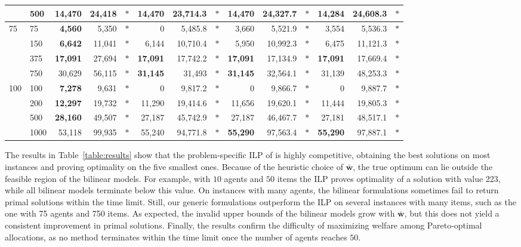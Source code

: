 \documentclass[a4paper, 11pt]{article}
\begin{document}
\begin{table}[htbp!]
\begin{adjustbox}{max width= \textwidth}
\begin{tabular}{@{\extracolsep{0pt}}llrrrrrrrrrrrr}
        & 500 & \textbf{14,470} & 24,418 & $*$ & \textbf{14,470} & 23,714.3 & $*$ & \textbf{14,470} & 24,327.7 & $*$ & 14,284 & 24,608.3 & $*$ \\ 
        \midrule
		\multirow{4}{*}{75} & 75 & \textbf{4,560} & 5,350 & $*$ & 0 & 5,485.8 & $*$ & 3,660 & 5,521.9 & $*$ & 3,554 & 5,536.3 & $*$ \\ 
		& 150 & \textbf{6,642} & 11,041 & $*$ & 6,144 & 10,710.4 & $*$ & 5,950 & 10,992.3 & $*$ & 6,475 & 11,121.3 & $*$ \\
        & 375 & \textbf{17,091} & 27,694 & $*$ & \textbf{17,091} & 17,742.2 & $*$ & \textbf{17,091} & 17,134.9 & $*$ & \textbf{17,091} & 17,669.4 & $*$ \\
        & 750 & 30,629 & 56,115 & $*$ & \textbf{31,145} & 31,493 & $*$ & \textbf{31,145} & 32,564.1 & $*$ & 31,139 & 48,253.3 & $*$ \\ 
        \midrule
		\multirow{4}{*}{100} & 100 & \textbf{7,278} & 9,631 & $*$ & 0 & 9,817.2 & $*$ & 0 & 9,866.7 & $*$ & 0 & 9,887.7 & $*$ \\ 
		& 200 & \textbf{12,297} & 19,732 & $*$ & 11,290 & 19,414.6 & $*$ & 11,656 & 19,620.1 & $*$ & 11,444 & 19,805.3 & $*$ \\
        & 500 & \textbf{28,160} & 49,507 & $*$ & 27,187 & 45,742.9 & $*$ & 27,187 & 46,467.7 & $*$ & 27,181 & 48,517.1 & $*$ \\
        & 1000 & 53,118 & 99,935 & $*$ & 55,240 & 94,771.8 & $*$ & \textbf{55,290} & 97,563.4 & $*$ & \textbf{55,290} & 97,887.1 & $*$ \\ 
		\bottomrule 
	\end{tabular} 
  	\end{adjustbox}
\end{table}

The results in Table~\ref{table:results} show that the problem-specific ILP of \citep{biro2021complexity} is highly competitive, obtaining the best solutions on most instances and proving optimality on the five smallest ones. Because of the heuristic choice of $\bm{\bar{w}}$, the true optimum can lie outside the feasible region of the bilinear models. For example, with $10$ agents and $50$ items the ILP proves optimality of a solution with value 223, while all bilinear models terminate below this value. On instances with many agents, the bilinear formulations sometimes fail to return primal solutions within the time limit. Still, our generic formulations outperform the ILP on several instances with many items, such as the one with 75 agents and 750 items. As expected, the invalid upper bounds of the bilinear models grow with $\bm{\bar{w}}$, but this does not yield a consistent improvement in primal solutions. Finally, the results confirm the difficulty of maximizing welfare among Pareto-optimal allocations, as no method terminates within the time limit once the number of agents reaches $50$.



\end{document}
